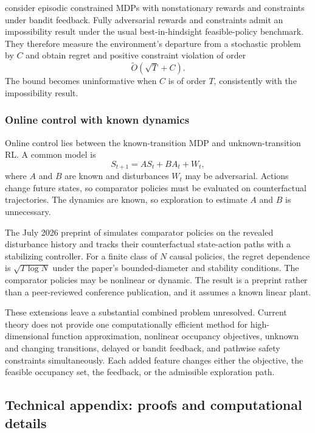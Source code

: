 \citet{stradi2025adversarial} consider episodic constrained MDPs with nonstationary rewards and constraints under bandit feedback. Fully adversarial rewards and constraints admit an impossibility result under the usual best-in-hindsight feasible-policy benchmark. They therefore measure the environment's departure from a stochastic problem by $C$ and obtain regret and positive constraint violation of order
\begin{equation}
\widetilde O(\sqrt T+C).
\label{eq:online_cmdp_adversarialness}
\end{equation}
The bound becomes uninformative when $C$ is of order $T$, consistently with the impossibility result.

\subsubsection{Online control with known dynamics}

Online control lies between the known-transition MDP and unknown-transition RL. A common model is
\begin{equation}
S_{t+1}=AS_t+BA_t+W_t,
\label{eq:online_linear_control}
\end{equation}
where $A$ and $B$ are known and disturbances $W_t$ may be adversarial. Actions change future states, so comparator policies must be evaluated on counterfactual trajectories. The dynamics are known, so exploration to estimate $A$ and $B$ is unnecessary.

The July 2026 preprint of \citet{xu2026counterfactual} simulates comparator policies on the revealed disturbance history and tracks their counterfactual state-action paths with a stabilizing controller. For a finite class of $N$ causal policies, the regret dependence is $\sqrt{T\log N}$ under the paper's bounded-diameter and stability conditions. The comparator policies may be nonlinear or dynamic. The result is a preprint rather than a peer-reviewed conference publication, and it assumes a known linear plant.

These extensions leave a substantial combined problem unresolved. Current theory does not provide one computationally efficient method for high-dimensional function approximation, nonlinear occupancy objectives, unknown and changing transitions, delayed or bandit feedback, and pathwise safety constraints simultaneously. Each added feature changes either the objective, the feasible occupancy set, the feedback, or the admissible exploration path.

\subsection{Technical appendix: proofs and computational details}
\label{sec:online_technical_appendix}

